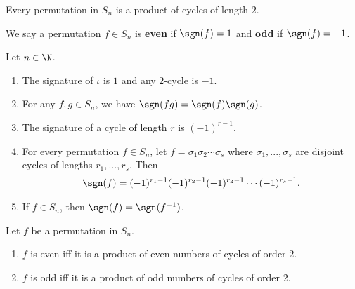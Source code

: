 \documentclass{article}
\begin{document}
\begin{lemma}
    Every permutation in $S_n$ is a product of cycles of length $2$.
\end{lemma}
\begin{definition}
    We say a permutation $f\in S_n$ is \textbf{even} if $\sgn(f)=1$ and \textbf{odd} if $\sgn(f) = -1$.
\end{definition}
\begin{lemma}
    Let $n\in\N$.
    \begin{enumerate}
        \item The signature of $\iota$ is $1$ and any $2$-cycle is $-1$.
        \item For any $f,g\in S_n$, we have $\sgn(fg)=\sgn(f)\sgn(g)$.
        \item The signature of a cycle of length $r$ is $(-1)^{r-1}$.
        \item For every permutation $f\in S_n$, let $f=\sigma_1\sigma_2\cdots \sigma_s$ where $\sigma_1,...,\sigma_s$ are disjoint cycles of lengths $r_1,...,r_s$. Then
        \begin{align*}
            \sgn(f)=(-1)^{r_1-1}(-1)^{r_2-1}(-1)^{r_3-1}\cdots(-1)^{r_s-1}.
        \end{align*}
        \item If $f\in S_n$, then $\sgn(f)=\sgn(f^{-1})$.
    \end{enumerate}
\end{lemma}
\begin{corollary}
    Let $f$ be a permutation in $S_n$.
    \begin{enumerate}
        \item $f$ is even iff it is a product of even numbers of cycles of order $2$.
        \item $f$ is odd iff it is a product of odd numbers of cycles of order $2$.
    \end{enumerate}
\end{corollary}
\end{document}
